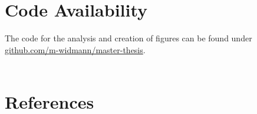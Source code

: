 \documentclass[12pt, a4paper, oneside]{article}
\begin{document}
\clearpage

\section*{\large Code Availability}
The code for the analysis and creation of figures can be found under \href{https://github.com/m-widmann/master-thesis}{github.com/m-widmann/master-thesis}.\\
\\

\section*{\large References}
\printbibliography[heading=none]

\clearpage
\end{document}
